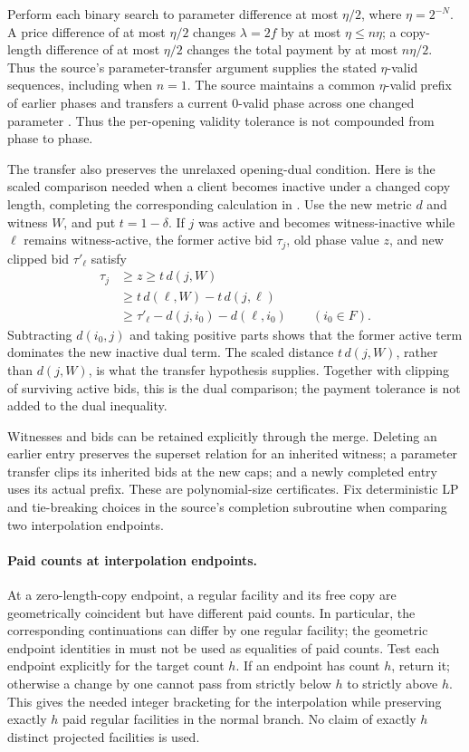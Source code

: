Perform each binary search to parameter difference at most $\eta/2$,
where $\eta=2^{-N}$. A price difference of at most $\eta/2$ changes
$\lambda=2f$ by at most $\eta\le n\eta$; a copy-length difference
of at most $\eta/2$ changes the total payment by at most $n\eta/2$.
Thus the source's parameter-transfer argument supplies the stated
$\eta$-valid sequences, including when $n=1$. The source maintains
a common $\eta$-valid prefix of earlier phases and transfers a current
$0$-valid phase across one changed parameter
\cite[Section~3.5]{CGLSS2026}. Thus the per-opening validity tolerance
is not compounded from phase to phase.

The transfer also preserves the unrelaxed opening-dual condition.
Here is the scaled comparison needed when a client becomes inactive
under a changed copy length, completing the corresponding calculation
in \cite[Section~3.5.1, Claim~2]{CGLSS2026}.  Use the new metric $d$
and witness $W$, and put $t=1-\delta$.  If $j$ was active and becomes
witness-inactive while $\ell$ remains witness-active, the
former active bid $\tau_j$, old phase value $z$, and new clipped bid
$\tau'_\ell$ satisfy
\[
 \begin{aligned}
 \tau_j&\ge z\ge t\,d(j,W)\\
 &\ge t\,d(\ell,W)-t\,d(j,\ell)\\
 &\ge\tau'_\ell-d(j,i_0)-d(\ell,i_0)
       \qquad(i_0\in F).
 \end{aligned}
\]
Subtracting $d(i_0,j)$ and taking positive parts shows that the
former active term dominates the new inactive dual term.  The scaled
distance $t\,d(j,W)$, rather than $d(j,W)$, is what the transfer
hypothesis supplies.  Together with clipping of surviving active bids,
this is the dual comparison; the payment tolerance is not added to the
dual inequality.

Witnesses and bids can be retained explicitly through the merge.
Deleting an earlier entry preserves the superset relation for an
inherited witness; a parameter transfer clips its inherited bids at
the new caps; and a newly completed entry uses its actual prefix.
These are polynomial-size certificates.  Fix deterministic LP and
tie-breaking choices in the source's completion subroutine when
comparing two interpolation endpoints.

\paragraph{Paid counts at interpolation endpoints.}
At a zero-length-copy endpoint, a regular facility and its free copy
are geometrically coincident but have different paid counts.  In
particular, the corresponding continuations can differ by one regular
facility; the geometric endpoint identities in
\cite[Section~3.5.2, Case~2; Section~3.5.3, Claim~5 and Case~3]{CGLSS2026}
must not be used as equalities of paid counts. Test each endpoint explicitly for the
target count $h$.  If an endpoint has count $h$, return it; otherwise
a change by one cannot pass from strictly below $h$ to strictly above
$h$.  This gives the needed integer bracketing for the interpolation
while preserving exactly $h$ paid regular facilities in the normal
branch.  No claim of exactly $h$ distinct projected facilities is used.


